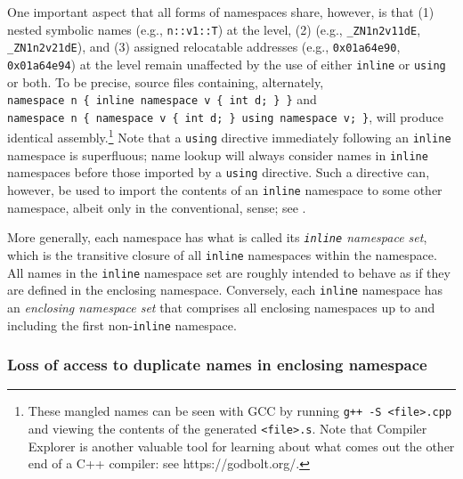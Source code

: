 One important aspect that all forms of namespaces share, however, is
that (1) nested symbolic names (e.g., \lstinline!n::v1::T!) at the
 level, (2)  (e.g.,
\lstinline!_ZN1n2v11dE!, \lstinline!_ZN1n2v21dE!), and (3) assigned
relocatable addresses (e.g., \lstinline!0x01a64e90!, \lstinline!0x01a64e94!)
at the  level remain unaffected by the use of either
\lstinline!inline! or \lstinline!using! or both. To be precise, source files containing, alternately, \lstinline!namespace!~\lstinline!n!~\lstinline!{!~\lstinline!inline!~\lstinline!namespace!~\lstinline!v!~\lstinline!{!~\lstinline!int!~\lstinline!d;!~\lstinline!}!~\lstinline!}!
and
\lstinline!namespace!~\lstinline!n!~\lstinline!{!~\lstinline!namespace!~\lstinline!v!~\lstinline!{!~\lstinline!int!~\lstinline!d;!~\lstinline!}!~\lstinline!using!~\lstinline!namespace!~\lstinline!v;!~\lstinline!}!, will produce identical assembly.{\cprotect\footnote{These mangled names can be seen with GCC by running \lstinline!g++!~\lstinline!-S!~\lstinline!<file>.cpp! and viewing the contents of the generated \lstinline!<file>.s!. Note that Compiler Explorer is another valuable tool for learning about what comes out the other end of a C++ compiler: see https://godbolt.org/.}} Note that a \lstinline!using! directive immediately following an \lstinline!inline!
namespace is superfluous; name lookup will always consider names in
\lstinline!inline! namespaces before those imported by a \lstinline!using!
directive. Such a directive can, however, be used to import the contents
of an \lstinline!inline! namespace to some other namespace, albeit only in
the conventional,  sense; see .

More generally, each namespace has what is called its
\emph{\lstinline!inline! namespace set}, which is the transitive closure of
all \lstinline!inline! namespaces within the namespace. All names in the
\lstinline!inline! namespace set are roughly intended to behave as if they
are defined in the enclosing namespace. Conversely, each \lstinline!inline!
namespace has an \emph{enclosing namespace set} that comprises all
enclosing namespaces up to and including the first non-\lstinline!inline!
namespace.

\subsubsection[Loss of access to duplicate names in enclosing namespace]{Loss of access to duplicate names in enclosing namespace}\label{loss-of-access-to-duplicate-names-in-enclosing-namespace}

